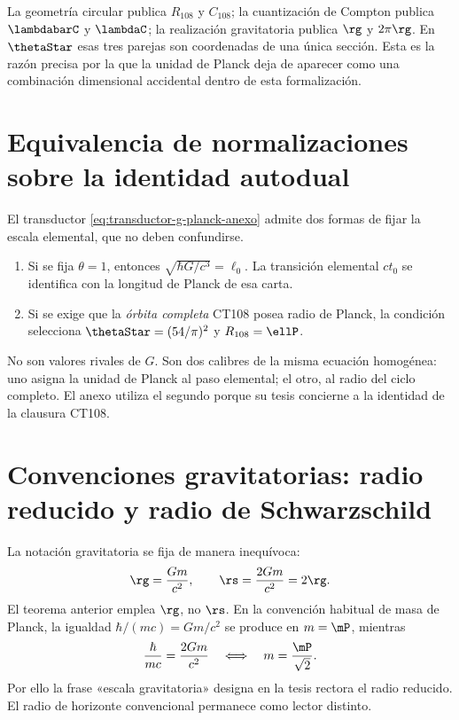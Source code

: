 \begin{remark}
La geometría circular publica \(R_{108}\) y \(C_{108}\); la cuantización de
Compton publica \(\lambdabarC\) y \(\lambdaC\); la realización gravitatoria
publica \(\rg\) y \(2\pi\rg\). En \(\thetaStar\) esas tres parejas son
coordenadas de una única sección. Esta es la razón precisa por la que la
unidad de Planck deja de aparecer como una combinación dimensional accidental
dentro de esta formalización.
\end{remark}

\section{Equivalencia de normalizaciones sobre la identidad autodual}

El transductor \eqref{eq:transductor-g-planck-anexo} admite dos formas de
fijar la escala elemental, que no deben confundirse.

\begin{enumerate}[label=\textup{(\roman*)}]
\item Si se fija \(\theta=1\), entonces
\(\sqrt{\hbar G/c^3}=\ell_0\). La transición elemental \(ct_0\) se identifica
con la longitud de Planck de esa carta.
\item Si se exige que la \emph{órbita completa} CT108 posea radio de Planck,
la condición selecciona \(\thetaStar=(54/\pi)^2\) y
\(R_{108}=\ellP\).
\end{enumerate}

No son valores rivales de \(G\). Son dos calibres de la misma ecuación
homogénea: uno asigna la unidad de Planck al paso elemental; el otro, al radio
del ciclo completo. El anexo utiliza el segundo porque su tesis concierne a
la identidad de la clausura CT108.

\section{Convenciones gravitatorias: radio reducido y radio de Schwarzschild}

La notación gravitatoria se fija de manera inequívoca:
\[
\rg=\frac{Gm}{c^2},
\qquad
\rs=\frac{2Gm}{c^2}=2\rg.
\]
El teorema anterior emplea \(\rg\), no \(\rs\). En la convención habitual de
masa de Planck, la igualdad \(\hbar/(mc)=Gm/c^2\) se produce en \(m=\mP\),
mientras
\begin{equation}
\frac{\hbar}{mc}=\frac{2Gm}{c^2}
\quad\Longleftrightarrow\quad
m=\frac{\mP}{\sqrt2}.
\label{eq:cruce-schwarzschild-factor-dos}
\end{equation}
Por ello la frase «escala gravitatoria» designa en la tesis rectora el radio
reducido. El radio de horizonte convencional permanece como lector distinto.

